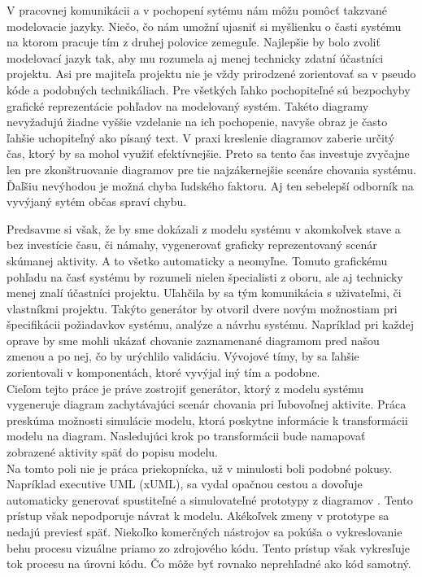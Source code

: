 V pracovnej komunikácii a v pochopení sytému nám môžu pomôcť takzvané modelovacie jazyky. Niečo, čo nám umožní ujasniť si myšlienku o časti systému na ktorom pracuje tím z druhej polovice zemeguľe. Najlepšie by bolo zvoliť modelovací jazyk tak, aby mu rozumela aj menej technicky zdatní účastníci projektu. Asi pre majiteľa projektu nie je vždy prirodzené zorientovať sa v pseudo kóde a podobných technikáliach. Pre všetkých ľahko pochopiteľné sú bezpochyby grafické reprezentácie pohľadov na modelovaný systém. Takéto diagramy nevyžadujú žiadne vyššie vzdelanie na ich pochopenie, navyše obraz je často ľahšie uchopiteľný ako písaný text. V praxi kreslenie diagramov zaberie určitý čas, ktorý by sa mohol využiť efektívnejšie. Preto sa tento čas investuje zvyčajne len pre zkonštruovanie diagramov pre tie najzákernejšie scenáre chovania systému. Ďaľšiu nevýhodou je možná chyba ľudského faktoru. Aj ten sebelepší odborník na vyvýjaný sytém občas spraví chybu.

Predsavme si však, že by sme dokázali z modelu systému v akomkoľvek stave a bez investície času, či námahy, vygenerovať graficky reprezentovaný scenár skúmanej aktivity. A to všetko automaticky a neomyľne. Tomuto grafickému pohľadu na časť systému by rozumeli nielen špecialisti z oboru, ale aj technicky menej znalí účastníci projektu. Uľahčila by sa tým komunikácia s uživateľmi, či vlastníkmi projektu. Takýto generátor by otvoril dvere novým možnostiam pri špecifikácii požiadavkov systému, analýze a návrhu systému. Napríklad pri každej oprave by sme mohli ukázať chovanie zaznamenané diagramom pred našou zmenou a po nej, čo by urýchlilo validáciu. Vývojové tímy, by sa ľahšie zorientovali v komponentách, ktoré vyvýjal iný tím a podobne. \\

Cieľom tejto práce je práve zostrojiť generátor, ktorý z modelu systému vygeneruje diagram zachytávajúci scenár chovania pri ľubovoľnej aktivite. Práca preskúma možnosti simulácie modelu, ktorá poskytne informácie k transformácii modelu na diagram. Nasledujúci krok po transformácii bude namapovať zobrazené aktivity späť do popisu modelu. \\

Na tomto poli nie je práca priekopnícka, už v minulosti boli podobné pokusy. Napríklad executive UML (xUML), sa vydal opačnou cestou a dovoľuje automaticky generovať spustiteľné a simulovateľné prototypy z diagramov \cite{milicev2009model-driven}. Tento prístup však nepodporuje návrat k modelu. Akékoľvek zmeny v prototype sa nedajú previesť späť. Niekoľko komerčných nástrojov sa pokúša o vykreslovanie behu procesu vizuálne priamo zo zdrojového kódu. Tento prístup však vykresľuje tok procesu na úrovni kódu. Čo môže byť rovnako neprehľadné ako kód samotný.



